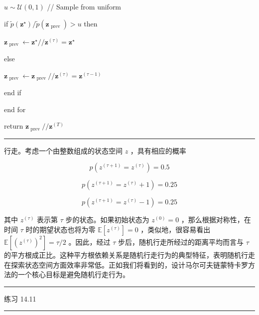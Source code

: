 \documentclass[10pt]{article}
\newcommand{\HRule}{\begin{center}\rule{0.9\linewidth}{0.2mm}\end{center}}
\begin{document}
\hspace*{1em} \(u \sim  \mathcal{U}\left( {0,1}\right)\) // Sample from uniform

\hspace*{1em} if \(\widetilde{p}\left( {\mathbf{z}}^{ \star  }\right) /\widetilde{p}\left( {\mathbf{z}}_{\text{ prev }}\right)  > u\) then

\hspace*{2em} \({\mathbf{z}}_{\text{ prev }} \leftarrow  {\mathbf{z}}^{ \star  }//{\mathbf{z}}^{\left( \tau \right) } = {\mathbf{z}}^{ \star  }\)

\hspace*{1em} else

\hspace*{2em} \({\mathbf{z}}_{\text{ prev }} \leftarrow  {\mathbf{z}}_{\text{ prev }}//{\mathbf{z}}^{\left( \tau \right) } = {\mathbf{z}}^{\left( \tau  - 1\right) }\)

\hspace*{1em} end if

end for

return \({\mathbf{z}}_{\text{ prev }}//{\mathbf{z}}^{\left( T\right) }\)

\HRule

行走。考虑一个由整数组成的状态空间 \(z\) ，具有相应的概率

\[
p\left( {{z}^{\left( \tau  + 1\right) } = {z}^{\left( \tau \right) }}\right)  = {0.5} \tag{14.28}
\]

\[
p\left( {{z}^{\left( \tau  + 1\right) } = {z}^{\left( \tau \right) } + 1}\right)  = {0.25} \tag{14.29}
\]

\[
p\left( {{z}^{\left( \tau  + 1\right) } = {z}^{\left( \tau \right) } - 1}\right)  = {0.25} \tag{14.30}
\]

其中 \({z}^{\left( \tau \right) }\) 表示第 \(\tau\) 步的状态。如果初始状态为 \({z}^{\left( 0\right) } = 0\) ，那么根据对称性，在时间 \(\tau\) 时的期望状态也将为零 \(\mathbb{E}\left\lbrack  {z}^{\left( \tau \right) }\right\rbrack   = 0\) ，类似地，很容易看出 \(\mathbb{E}\left\lbrack  {\left( {z}^{\left( \tau \right) }\right) }^{2}\right\rbrack   = \tau /2\) 。因此，经过 \(\tau\) 步后，随机行走所经过的距离平均而言与 \(\tau\) 的平方根成正比。这种平方根依赖关系是随机行走行为的典型特征，表明随机行走在探索状态空间方面效率非常低。正如我们将看到的，设计马尔可夫链蒙特卡罗方法的一个核心目标是避免随机行走行为。

\HRule

练习 14.11

\HRule
\end{document}
